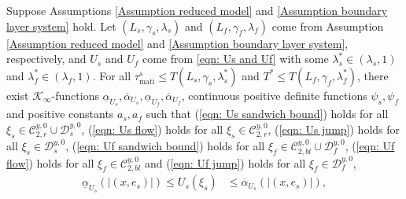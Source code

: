 \begin{lem}\label{Lemma MATI}
Suppose Assumptions \ref{Assumption reduced model} and \ref{Assumption boundary layer system} hold. 
%
%
Let $(L_s, \gamma_s, \lambda_s)$ and $(L_f, \gamma_f, \lambda_f)$ come from Assumption \ref{Assumption reduced model} and \ref{Assumption boundary layer system}, respectively, and $U_s$ and $U_f$ come from \eqref{eqn: Us and Uf} with some $\lambda_s^*\in (\lambda_s,1)$ and $\lambda_f^*\in (\lambda_f,1)$.
For all $\tau_{\text{mati}}^s \leq T(L_s,\gamma_s, \lambda_s^*)$ and $T^* \leq T(L_f, \gamma_f, \lambda_f^*)$, there exist %
$\mathcal{K}_\infty$-functions $\underline{\alpha}_{U_s}, \overline{\alpha}_{U_s},\underline{\alpha}_{U_f}, \overline{\alpha}_{U_f}$, continuous positive definite functions $\psi_s, \psi_f$ and positive constants $a_s,a_f$ such that 
(\ref{eqn: Us sandwich bound}) holds for all $\xi_s \in \mathcal{C}_{2,r}^{y,0} \cup \mathcal{D}_s^{y,0}$, (\ref{eqn: Us flow}) holds for all $\xi_s \in \mathcal{C}_{2,r}^{y,0}$, (\ref{eqn: Us jump}) holds for all $\xi_s \in \mathcal{D}_s^{y,0}$, (\ref{eqn: Uf sandwich bound}) holds for all $\xi_f \in \mathcal{C}_{2,bl}^{y,0} \cup \mathcal{D}_f^{y,0}$, (\ref{eqn: Uf flow}) holds for all $\xi_f \in \mathcal{C}_{2,bl}^{y,0}$ and (\ref{eqn: Uf jump}) holds for all $\xi_f \in \mathcal{D}_f^{y,0}$,
%
\begin{subequations}
     \begin{align}
        \underline{\alpha}_{U_s}\left(\left| ( x , e_s ) \right|\right) \leq {U_s}(\xi_s) &\leq \overline{\alpha}_{U_s}\left(\left| (x, e_s) \right|\right),

\end{align}
\end{subequations}
\end{lem}

